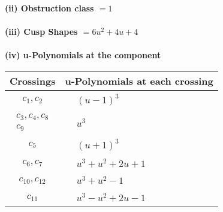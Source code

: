 \documentclass[1p]{elsarticle_modified}
\theoremstyle{definition}
\begin{document}
\flushleft \textbf{(ii) Obstruction class $= 1$}\\~\\
\flushleft \textbf{(iii) Cusp Shapes $= 6 u^2+4 u+4$}\\~\\
\newpage\renewcommand{\arraystretch}{1}
\flushleft \textbf{(iv) u-Polynomials at the component}\newline \\
\begin{tabular}{m{50pt}|m{274pt}}
Crossings & \hspace{64pt}u-Polynomials at each crossing \\
\hline $$\begin{aligned}c_{1},c_{2}\end{aligned}$$&$\begin{aligned}
&(u-1)^3
\end{aligned}$\\
\hline $$\begin{aligned}c_{3},c_{4},c_{8}\\c_{9}\end{aligned}$$&$\begin{aligned}
&u^3
\end{aligned}$\\
\hline $$\begin{aligned}c_{5}\end{aligned}$$&$\begin{aligned}
&(u+1)^3
\end{aligned}$\\
\hline $$\begin{aligned}c_{6},c_{7}\end{aligned}$$&$\begin{aligned}
&u^3+u^2+2 u+1
\end{aligned}$\\
\hline $$\begin{aligned}c_{10},c_{12}\end{aligned}$$&$\begin{aligned}
&u^3+u^2-1
\end{aligned}$\\
\hline $$\begin{aligned}c_{11}\end{aligned}$$&$\begin{aligned}
&u^3- u^2+2 u-1
\end{aligned}$\\
\hline
\end{tabular}\\~\\
\end{document}
